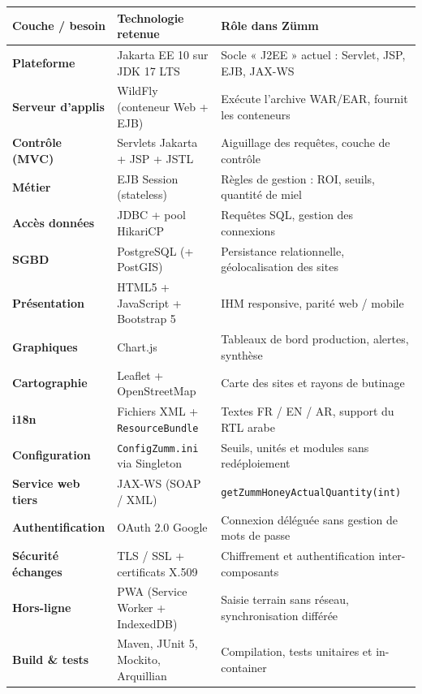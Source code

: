 \begin{xltabular}{\textwidth}{>{\bfseries}p{3.1cm} p{4.9cm} X}
\toprule
\textbf{Couche / besoin} & \textbf{Technologie retenue} & \textbf{Rôle dans Zümm} \\
\midrule
\endhead
Plateforme        & Jakarta EE 10 sur JDK 17 LTS      & Socle « J2EE » actuel : Servlet, JSP, EJB, JAX-WS \\
Serveur d'applis  & WildFly (conteneur Web + EJB)     & Exécute l'archive WAR/EAR, fournit les conteneurs \\
Contrôle (MVC)    & Servlets Jakarta + JSP + JSTL     & Aiguillage des requêtes, couche de contrôle \\
Métier            & EJB Session (stateless)           & Règles de gestion : ROI, seuils, quantité de miel \\
Accès données     & JDBC + pool HikariCP              & Requêtes SQL, gestion des connexions \\
SGBD              & PostgreSQL (+ PostGIS)            & Persistance relationnelle, géolocalisation des sites \\
Présentation      & HTML5 + JavaScript + Bootstrap 5  & IHM responsive, parité web / mobile \\
Graphiques        & Chart.js                          & Tableaux de bord production, alertes, synthèse \\
Cartographie      & Leaflet + OpenStreetMap           & Carte des sites et rayons de butinage \\
i18n              & Fichiers XML + \texttt{ResourceBundle} & Textes FR / EN / AR, support du RTL arabe \\
Configuration     & \texttt{ConfigZumm.ini} via Singleton  & Seuils, unités et modules sans redéploiement \\
Service web tiers & JAX-WS (SOAP / XML)               & \texttt{getZummHoneyActualQuantity(int)} \\
Authentification  & OAuth 2.0 Google                  & Connexion déléguée sans gestion de mots de passe \\
Sécurité échanges & TLS / SSL + certificats X.509     & Chiffrement et authentification inter-composants \\
Hors-ligne        & PWA (Service Worker + IndexedDB)  & Saisie terrain sans réseau, synchronisation différée \\
Build \& tests    & Maven, JUnit 5, Mockito, Arquillian & Compilation, tests unitaires et in-container \\
\bottomrule
\end{xltabular}

